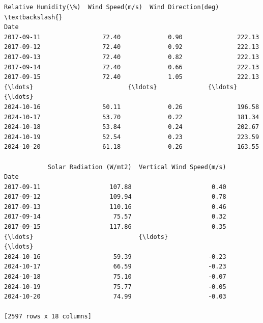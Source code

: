 \documentclass[11pt]{article}
\begin{document}
\begin{tcolorbox}[breakable, size=fbox, boxrule=.5pt, pad at break*=1mm, opacityfill=0]
\begin{Verbatim}[commandchars=\\\{\}]
            Relative Humidity(\%)  Wind Speed(m/s)  Wind Direction(deg)  \textbackslash{}
Date
2017-09-11                 72.40             0.90               222.13
2017-09-12                 72.40             0.92               222.13
2017-09-13                 72.40             0.82               222.13
2017-09-14                 72.40             0.66               222.13
2017-09-15                 72.40             1.05               222.13
{\ldots}                          {\ldots}              {\ldots}                  {\ldots}
2024-10-16                 50.11             0.26               196.58
2024-10-17                 53.70             0.22               181.34
2024-10-18                 53.84             0.24               202.67
2024-10-19                 52.54             0.23               223.59
2024-10-20                 61.18             0.26               163.55

            Solar Radiation (W/mt2)  Vertical Wind Speed(m/s)
Date
2017-09-11                   107.88                      0.40
2017-09-12                   109.94                      0.78
2017-09-13                   110.16                      0.46
2017-09-14                    75.57                      0.32
2017-09-15                   117.86                      0.35
{\ldots}                             {\ldots}                       {\ldots}
2024-10-16                    59.39                     -0.23
2024-10-17                    66.59                     -0.23
2024-10-18                    75.10                     -0.07
2024-10-19                    75.77                     -0.05
2024-10-20                    74.99                     -0.03

[2597 rows x 18 columns]
\end{Verbatim}
\end{tcolorbox}
        
\end{document}
